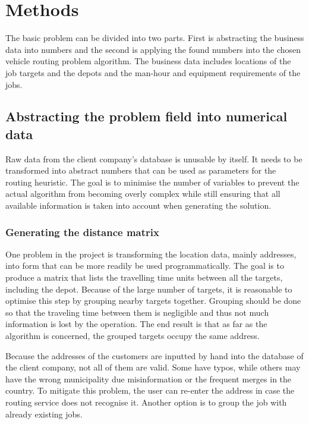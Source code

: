 \chapter{Methods}
\label{chapter:methods}

The basic problem can be divided into two parts. First is abstracting the business data into numbers and the second is applying the found numbers into the chosen vehicle routing problem algorithm. The business data includes locations of the job targets and the depots and the man-hour and equipment requirements of the jobs.  

\section{Abstracting the problem field into numerical data}

Raw data from the client company's database is unusable by itself. It needs to be transformed into abstract numbers that can be used as parameters for the routing heuristic. The goal is to minimise the number of variables to prevent the actual algorithm from becoming overly complex while still ensuring that all available information is taken into account when generating the solution. 

\subsection{Generating the distance matrix}

One problem in the project is transforming the location data, mainly addresses, into form that can be more readily be used programmatically. The goal is to produce a matrix that lists the travelling time units between all the targets, including the depot. Because of the large number of targets, it is reasonable to optimise this step by grouping nearby targets together. Grouping should be done so that the traveling time between them is negligible and thus not much information is lost by the operation. The end result is that as far as the algorithm is concerned, the grouped targets occupy the same address.

Because the addresses of the customers are inputted by hand into the database of the client company, not all of them are valid. Some have typos, while others may have the wrong municipality due misinformation or the frequent merges in the country. To mitigate this problem, the user can re-enter the address in case the routing service does not recognise it. Another option is to group the job with already existing jobs.

